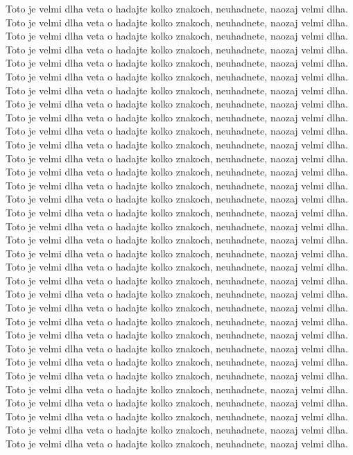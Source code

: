 Toto je velmi dlha veta o hadajte kolko znakoch, neuhadnete, naozaj velmi dlha.
Toto je velmi dlha veta o hadajte kolko znakoch, neuhadnete, naozaj velmi dlha.
Toto je velmi dlha veta o hadajte kolko znakoch, neuhadnete, naozaj velmi dlha.
Toto je velmi dlha veta o hadajte kolko znakoch, neuhadnete, naozaj velmi dlha.
Toto je velmi dlha veta o hadajte kolko znakoch, neuhadnete, naozaj velmi dlha.
Toto je velmi dlha veta o hadajte kolko znakoch, neuhadnete, naozaj velmi dlha.
Toto je velmi dlha veta o hadajte kolko znakoch, neuhadnete, naozaj velmi dlha.
Toto je velmi dlha veta o hadajte kolko znakoch, neuhadnete, naozaj velmi dlha.
Toto je velmi dlha veta o hadajte kolko znakoch, neuhadnete, naozaj velmi dlha.
Toto je velmi dlha veta o hadajte kolko znakoch, neuhadnete, naozaj velmi dlha.
Toto je velmi dlha veta o hadajte kolko znakoch, neuhadnete, naozaj velmi dlha.
Toto je velmi dlha veta o hadajte kolko znakoch, neuhadnete, naozaj velmi dlha.
Toto je velmi dlha veta o hadajte kolko znakoch, neuhadnete, naozaj velmi dlha.
Toto je velmi dlha veta o hadajte kolko znakoch, neuhadnete, naozaj velmi dlha.
Toto je velmi dlha veta o hadajte kolko znakoch, neuhadnete, naozaj velmi dlha.
Toto je velmi dlha veta o hadajte kolko znakoch, neuhadnete, naozaj velmi dlha.
Toto je velmi dlha veta o hadajte kolko znakoch, neuhadnete, naozaj velmi dlha.
Toto je velmi dlha veta o hadajte kolko znakoch, neuhadnete, naozaj velmi dlha.
Toto je velmi dlha veta o hadajte kolko znakoch, neuhadnete, naozaj velmi dlha.
Toto je velmi dlha veta o hadajte kolko znakoch, neuhadnete, naozaj velmi dlha.
Toto je velmi dlha veta o hadajte kolko znakoch, neuhadnete, naozaj velmi dlha.
Toto je velmi dlha veta o hadajte kolko znakoch, neuhadnete, naozaj velmi dlha.
Toto je velmi dlha veta o hadajte kolko znakoch, neuhadnete, naozaj velmi dlha.
Toto je velmi dlha veta o hadajte kolko znakoch, neuhadnete, naozaj velmi dlha.
Toto je velmi dlha veta o hadajte kolko znakoch, neuhadnete, naozaj velmi dlha.
Toto je velmi dlha veta o hadajte kolko znakoch, neuhadnete, naozaj velmi dlha.
Toto je velmi dlha veta o hadajte kolko znakoch, neuhadnete, naozaj velmi dlha.
Toto je velmi dlha veta o hadajte kolko znakoch, neuhadnete, naozaj velmi dlha.
Toto je velmi dlha veta o hadajte kolko znakoch, neuhadnete, naozaj velmi dlha.
Toto je velmi dlha veta o hadajte kolko znakoch, neuhadnete, naozaj velmi dlha.
Toto je velmi dlha veta o hadajte kolko znakoch, neuhadnete, naozaj velmi dlha.
Toto je velmi dlha veta o hadajte kolko znakoch, neuhadnete, naozaj velmi dlha.
Toto je velmi dlha veta o hadajte kolko znakoch, neuhadnete, naozaj velmi dlha.
